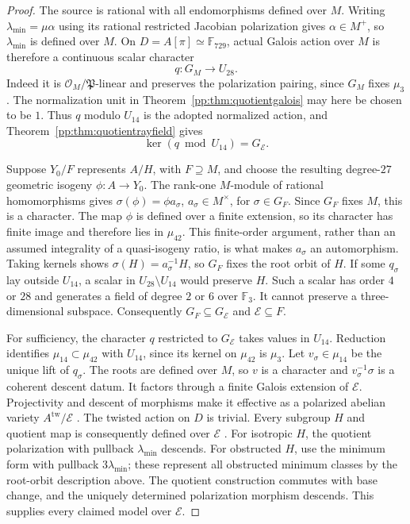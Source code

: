 \begin{proof}
The source is rational with all endomorphisms defined over $M$.
Writing $\lambda_{\min}=\mu\alpha$ using its rational restricted
Jacobian polarization gives $\alpha\in M^+$, so $\lambda_{\min}$
is defined over $M$. On
$D=A[\pi]\simeq\mathbb F_{729}$, actual Galois action over $M$
is therefore a continuous scalar character
\[
 q:G_M\longrightarrow U_{28}.
\]
Indeed it is $\mathcal O_M/\mathfrak P$-linear and preserves the
polarization pairing, since $G_M$ fixes $\mu_3$. The normalization
unit in Theorem~\ref{pp:thm:quotientgalois} may here be chosen to be
$1$. Thus $q$ modulo $U_{14}$ is the adopted normalized action, and
Theorem~\ref{pp:thm:quotientrayfield} gives
\[
 \ker(q\bmod U_{14})=G_{\mathcal E}.
\]

Suppose $Y_0/F$ represents $A/H$, with $F\supseteq M$, and choose the
resulting degree-$27$ geometric isogeny $\phi:A\longrightarrow Y_0$.
The rank-one $M$-module of rational homomorphisms gives
$\sigma(\phi)=\phi a_\sigma$, $a_\sigma\in M^\times$, for
$\sigma\in G_F$. Since $G_F$ fixes $M$, this is a character.
The map $\phi$ is defined over a finite extension, so its character
has finite image and therefore lies in $\mu_{42}$. This finite-order
argument, rather than an assumed integrality of a quasi-isogeny ratio,
is what makes $a_\sigma$ an automorphism. Taking kernels shows
$\sigma(H)=a_\sigma^{-1}H$, so $G_F$ fixes the root orbit of $H$.
If some $q_\sigma$ lay outside $U_{14}$, a scalar in
$U_{28}\setminus U_{14}$ would preserve $H$. Such a scalar has
order $4$ or $28$ and generates a field of degree $2$ or $6$ over
$\mathbb F_3$. It cannot preserve a three-dimensional subspace.
Consequently $G_F\subseteq G_{\mathcal E}$ and
$\mathcal E\subseteq F$.

For sufficiency, the character $q$ restricted to $G_{\mathcal E}$
takes values in $U_{14}$. Reduction identifies
$\mu_{14}\subset\mu_{42}$ with $U_{14}$, since its kernel on
$\mu_{42}$ is $\mu_3$. Let $v_\sigma\in\mu_{14}$ be the unique
lift of $q_\sigma$. The roots are defined over $M$, so $v$ is a
character and $v_\sigma^{-1}\sigma$ is a coherent descent datum.
It factors through a finite Galois extension of $\mathcal E$.
Projectivity and descent of morphisms make it effective as a polarized
abelian variety $A^{\mathrm{tw}}/\mathcal E$ \cite{StacksDescent}.
The twisted action on $D$ is trivial. Every subgroup $H$ and quotient
map is consequently defined over $\mathcal E$
\cite[Chap.~IV, Lemma~2.1]{MilneAV2008}. For isotropic $H$,
the quotient polarization with pullback $\lambda_{\min}$ descends.
For obstructed $H$, use the minimum form with pullback
$3\lambda_{\min}$; these represent all obstructed minimum classes
by the root-orbit description above. The quotient construction
commutes with base change, and the uniquely determined polarization
morphism descends. This supplies every claimed model over $\mathcal E$.


\end{proof}
